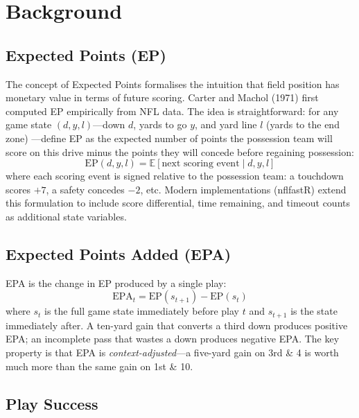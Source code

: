 \documentclass[11pt]{article}
\newcommand{\E}{\mathbb{E}}
\begin{document}
\section{Background}
\label{sec:background}

\subsection{Expected Points (EP)}

The concept of Expected Points formalises the intuition that field position has
monetary value in terms of future scoring. Carter and Machol (1971) first computed
EP empirically from NFL data. The idea is straightforward: for any game state
$(d, y, l)$---down $d$, yards to go $y$, and yard line $l$ (yards to the end zone)
---define EP as the expected number of points the possession team will score on
this drive minus the points they will concede before regaining possession:
\begin{equation}
  \text{EP}(d, y, l) = \E[\text{next scoring event} \mid d, y, l]
\end{equation}
where each scoring event is signed relative to the possession team: a touchdown
scores $+7$, a safety concedes $-2$, etc. Modern implementations (nflfastR) extend
this formulation to include score differential, time remaining, and timeout counts
as additional state variables.

\subsection{Expected Points Added (EPA)}

EPA is the change in EP produced by a single play:
\begin{equation}
  \text{EPA}_t = \text{EP}(s_{t+1}) - \text{EP}(s_t)
\end{equation}
where $s_t$ is the full game state immediately before play $t$ and $s_{t+1}$ is the
state immediately after. A ten-yard gain that converts a third down produces positive
EPA; an incomplete pass that wastes a down produces negative EPA. The key property is
that EPA is \emph{context-adjusted}---a five-yard gain on 3rd \& 4 is worth much more
than the same gain on 1st \& 10.

\subsection{Play Success}
\end{document}
